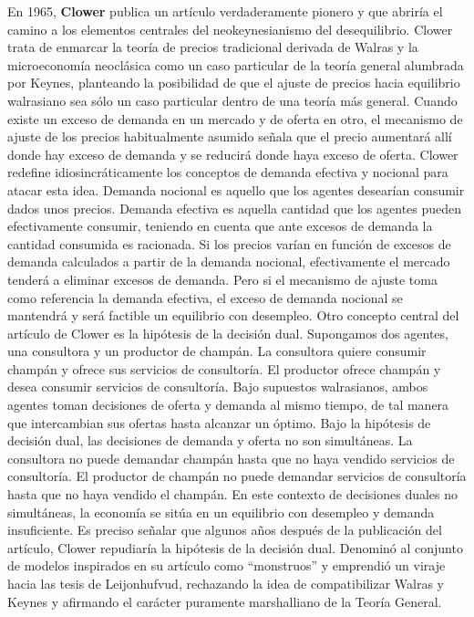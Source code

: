 \documentclass{nuevotema}
\begin{document}
En 1965, \textbf{Clower} publica un artículo verdaderamente pionero y que abriría el camino a los elementos centrales del neokeynesianismo del desequilibrio. Clower trata de enmarcar la teoría de precios tradicional derivada de Walras y la microeconomía neoclásica como un caso particular de la teoría general alumbrada por Keynes, planteando la posibilidad de que el ajuste de precios hacia equilibrio walrasiano sea sólo un caso particular dentro de una teoría más general. Cuando existe un exceso de demanda en un mercado y de oferta en otro, el mecanismo de ajuste de los precios habitualmente asumido señala que el precio aumentará allí donde hay exceso de demanda y se reducirá donde haya exceso de oferta. Clower redefine idiosincráticamente los conceptos de demanda efectiva y nocional para atacar esta idea. Demanda nocional es aquello que los agentes desearían consumir dados unos precios. Demanda efectiva es aquella cantidad que los agentes pueden efectivamente consumir, teniendo en cuenta que ante excesos de demanda la cantidad consumida es racionada. Si los precios varían en función de excesos de demanda calculados a partir de la demanda nocional, efectivamente el mercado tenderá a eliminar excesos de demanda. Pero si el mecanismo de ajuste toma como referencia la demanda efectiva, el exceso de demanda nocional se mantendrá y será factible un equilibrio con desempleo. Otro concepto central del artículo de Clower es la hipótesis de la decisión dual. Supongamos dos agentes, una consultora y un productor de champán. La consultora quiere consumir champán y ofrece sus servicios de consultoría. El productor ofrece champán y desea consumir servicios de consultoría. Bajo supuestos walrasianos, ambos agentes toman decisiones de oferta y demanda al mismo tiempo, de tal manera que intercambian sus ofertas hasta alcanzar un óptimo. Bajo la hipótesis de decisión dual, las decisiones de demanda y oferta no son simultáneas. La consultora no puede demandar champán hasta que no haya vendido servicios de consultoría. El productor de champán no puede demandar servicios de consultoría hasta que no haya vendido el champán. En este contexto de decisiones duales no simultáneas, la economía se sitúa en un equilibrio con desempleo y demanda insuficiente. Es preciso señalar que algunos años después de la publicación del artículo, Clower repudiaría la hipótesis de la decisión dual. Denominó al conjunto de modelos inspirados en su artículo como ``monstruos'' y emprendió un viraje hacia las tesis de Leijonhufvud, rechazando la idea de compatibilizar Walras y Keynes y afirmando el carácter puramente marshalliano de la Teoría General.
\end{document}
